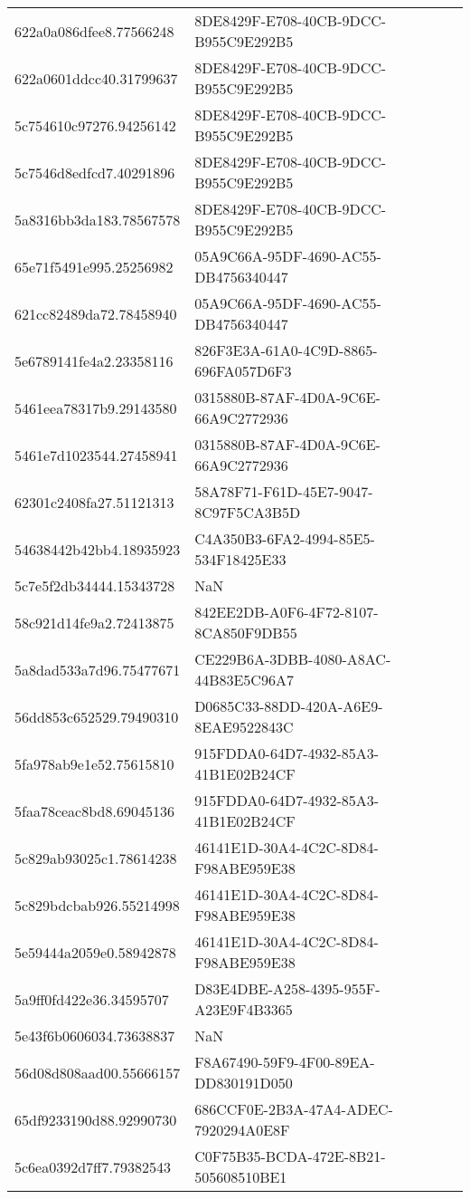 \begin{tabular}{ll}
622a0a086dfee8.77566248 & 8DE8429F-E708-40CB-9DCC-B955C9E292B5 \\
622a0601ddcc40.31799637 & 8DE8429F-E708-40CB-9DCC-B955C9E292B5 \\
5c754610c97276.94256142 & 8DE8429F-E708-40CB-9DCC-B955C9E292B5 \\
5c7546d8edfcd7.40291896 & 8DE8429F-E708-40CB-9DCC-B955C9E292B5 \\
5a8316bb3da183.78567578 & 8DE8429F-E708-40CB-9DCC-B955C9E292B5 \\
65e71f5491e995.25256982 & 05A9C66A-95DF-4690-AC55-DB4756340447 \\
621cc82489da72.78458940 & 05A9C66A-95DF-4690-AC55-DB4756340447 \\
5e6789141fe4a2.23358116 & 826F3E3A-61A0-4C9D-8865-696FA057D6F3 \\
5461eea78317b9.29143580 & 0315880B-87AF-4D0A-9C6E-66A9C2772936 \\
5461e7d1023544.27458941 & 0315880B-87AF-4D0A-9C6E-66A9C2772936 \\
62301c2408fa27.51121313 & 58A78F71-F61D-45E7-9047-8C97F5CA3B5D \\
54638442b42bb4.18935923 & C4A350B3-6FA2-4994-85E5-534F18425E33 \\
5c7e5f2db34444.15343728 & NaN \\
58c921d14fe9a2.72413875 & 842EE2DB-A0F6-4F72-8107-8CA850F9DB55 \\
5a8dad533a7d96.75477671 & CE229B6A-3DBB-4080-A8AC-44B83E5C96A7 \\
56dd853c652529.79490310 & D0685C33-88DD-420A-A6E9-8EAE9522843C \\
5fa978ab9e1e52.75615810 & 915FDDA0-64D7-4932-85A3-41B1E02B24CF \\
5faa78ceac8bd8.69045136 & 915FDDA0-64D7-4932-85A3-41B1E02B24CF \\
5c829ab93025c1.78614238 & 46141E1D-30A4-4C2C-8D84-F98ABE959E38 \\
5c829bdcbab926.55214998 & 46141E1D-30A4-4C2C-8D84-F98ABE959E38 \\
5e59444a2059e0.58942878 & 46141E1D-30A4-4C2C-8D84-F98ABE959E38 \\
5a9ff0fd422e36.34595707 & D83E4DBE-A258-4395-955F-A23E9F4B3365 \\
5e43f6b0606034.73638837 & NaN \\
56d08d808aad00.55666157 & F8A67490-59F9-4F00-89EA-DD830191D050 \\
65df9233190d88.92990730 & 686CCF0E-2B3A-47A4-ADEC-7920294A0E8F \\
5c6ea0392d7ff7.79382543 & C0F75B35-BCDA-472E-8B21-505608510BE1 \\

\end{tabular}

